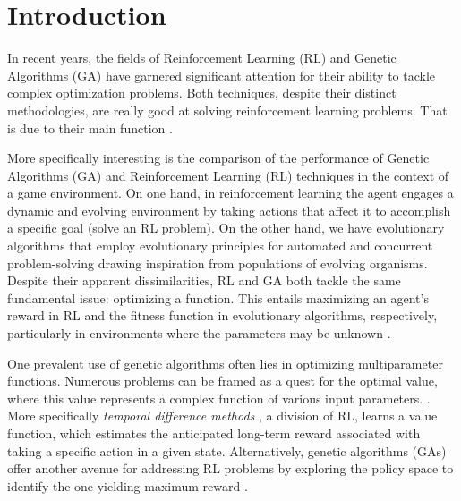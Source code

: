 \section{Introduction}

In recent years, the fields of Reinforcement Learning (RL) and Genetic Algorithms (GA) have garnered significant attention for their ability to tackle complex optimization problems. Both techniques, despite their distinct methodologies, are really good at solving reinforcement learning problems. That is due to their main function  \cite{taylor2006comparing}. 


More specifically interesting is the comparison of the performance of Genetic Algorithms (GA) and Reinforcement Learning (RL) techniques in the context of a game environment. On one hand, in reinforcement learning the agent engages a dynamic and evolving environment by taking actions that affect it to accomplish a specific goal (solve an RL problem). On the other hand, we have evolutionary algorithms that employ evolutionary principles for automated and concurrent problem-solving drawing inspiration from populations of evolving organisms. Despite their apparent dissimilarities, RL and GA both tackle the same fundamental issue: optimizing a function. This entails maximizing an agent's reward in RL and the fitness function in evolutionary algorithms, respectively, particularly in environments where the parameters may be unknown \cite{drugan2019reinforcement}.  

 One prevalent use of genetic algorithms often lies in optimizing multiparameter functions. Numerous problems can be framed as a quest for the optimal value, where this value represents a complex function of various input parameters. \cite{forrest1996genetic}. More specifically \textit{temporal difference methods} , a division of RL,  learns a value function, which estimates the anticipated long-term reward associated with taking a specific action in a given state. Alternatively, genetic algorithms (GAs) offer another avenue for addressing RL problems by exploring the policy space to identify the one yielding maximum reward \cite{taylor2006comparing}. 

